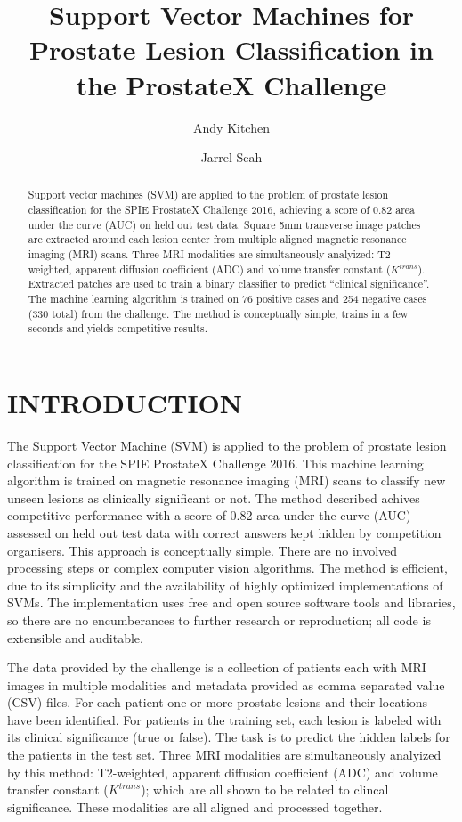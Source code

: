\documentclass[a4paper]{spie}
\title{Support Vector Machines for Prostate Lesion Classification in the ProstateX Challenge}
\author[a]{Andy Kitchen}
\author[b]{Jarrel Seah}
\affil[a]{Silverpond,
  Level 2 / 382 Little Collins Street,
  Melbourne, Australia}
\affil[b]{Alfred Hospital,
  55 Commercial Road,
  Melbourne, Australia}
\begin{document}
 
\maketitle

\begin{abstract}
Support vector machines (SVM) are applied to the problem of prostate lesion classification for the SPIE ProstateX Challenge 2016, achieving a score of 0.82 area under the curve (AUC) on held out test data. Square 5mm transverse image patches are extracted around each lesion center from multiple aligned magnetic resonance imaging (MRI) scans. Three MRI modalities are simultaneously analyized: T2-weighted, apparent diffusion coefficient (ADC) and volume transfer constant ($K^{trans}$). Extracted patches are used to train a binary classifier to predict ``clinical significance''.  The machine learning algorithm is trained on 76 positive cases and 254 negative cases (330 total) from the challenge. The method is conceptually simple, trains in a few seconds and yields competitive results.
\end{abstract}

\section{INTRODUCTION}

The Support Vector Machine\cite{CortesVapnik1995} (SVM) is applied to the problem of prostate lesion classification for the SPIE ProstateX Challenge 2016. This machine learning algorithm is trained on magnetic resonance imaging (MRI) scans to classify new unseen lesions as clinically significant or not. The method described achives competitive performance with a score of 0.82 area under the curve (AUC) assessed on held out test data with correct answers kept hidden by competition organisers. This approach is conceptually simple. There are no involved processing steps or complex computer vision algorithms. The method is efficient, due to its simplicity and the availability of highly optimized implementations of SVMs. The implementation uses free and open source software tools and libraries, so there are no encumberances to further research or reproduction; all code is extensible and auditable.

The data provided by the challenge is a collection of patients each with MRI images in multiple modalities and metadata provided as comma separated value (CSV) files. For each patient one or more prostate lesions and their locations have been identified. For patients in the training set, each lesion is labeled with its clinical significance (true or false). The task is to predict the hidden labels for the patients in the test set. Three MRI modalities are simultaneously analyized by this method: T2-weighted, apparent diffusion coefficient (ADC) and volume transfer constant ($K^{\mathit{trans}}$); which are all shown to be related to clincal significance\cite{langer2010prostate}. These modalities are all aligned and processed together.
\end{document}
